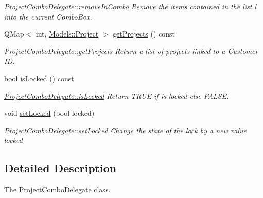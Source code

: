 \begin{DoxyCompactItemize}
\begin{DoxyCompactList}\small\item\em \hyperlink{classGui_1_1Widgets_1_1Delegates_1_1ProjectComboDelegate_a2c063b4b737ff627696a1b247860cc4b}{Project\+Combo\+Delegate\+::remove\+In\+Combo} Remove the items contained in the list {\itshape l} into the current Combo\+Box. \end{DoxyCompactList}\item 
Q\+Map$<$ int, \hyperlink{classModels_1_1Project}{Models\+::\+Project} $>$ \hyperlink{classGui_1_1Widgets_1_1Delegates_1_1ProjectComboDelegate_a63d0ef3a5179d72ab577f359c8f7a6fa}{get\+Projects} () const 
\begin{DoxyCompactList}\small\item\em \hyperlink{classGui_1_1Widgets_1_1Delegates_1_1ProjectComboDelegate_a63d0ef3a5179d72ab577f359c8f7a6fa}{Project\+Combo\+Delegate\+::get\+Projects} Return a list of projects linked to a Customer I\+D. \end{DoxyCompactList}\item 
bool \hyperlink{classGui_1_1Widgets_1_1Delegates_1_1ProjectComboDelegate_a4a6f72086d21f27d7bede82e17a77501}{is\+Locked} () const 
\begin{DoxyCompactList}\small\item\em \hyperlink{classGui_1_1Widgets_1_1Delegates_1_1ProjectComboDelegate_a4a6f72086d21f27d7bede82e17a77501}{Project\+Combo\+Delegate\+::is\+Locked} Return T\+R\+U\+E if is locked else F\+A\+L\+S\+E. \end{DoxyCompactList}\item 
void \hyperlink{classGui_1_1Widgets_1_1Delegates_1_1ProjectComboDelegate_a314629bddab90168c13ca11370c1968f}{set\+Locked} (bool locked)
\begin{DoxyCompactList}\small\item\em \hyperlink{classGui_1_1Widgets_1_1Delegates_1_1ProjectComboDelegate_a314629bddab90168c13ca11370c1968f}{Project\+Combo\+Delegate\+::set\+Locked} Change the state of the lock by a new value {\itshape locked} \end{DoxyCompactList}\end{DoxyCompactItemize}


\subsection{Detailed Description}
The \hyperlink{classGui_1_1Widgets_1_1Delegates_1_1ProjectComboDelegate}{Project\+Combo\+Delegate} class. 

